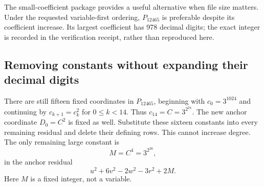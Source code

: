 The small-coefficient package provides a useful alternative when file
size matters. Under the requested variable-first ordering,
$P_{12465}$ is preferable despite its coefficient increase. Its largest
coefficient has 978 decimal digits; the exact integer is recorded in the
verification receipt, rather than reproduced here.

\subsection{Removing constants without expanding their decimal digits}

There are still fifteen fixed coordinates in $P_{12465}$, beginning
with $c_0=3^{1024}$ and continuing by $c_{k+1}=c_k^2$ for
$0\leq k<14$. Thus $c_{14}=C=3^{2^{24}}$. The new anchor coordinate
$D_0=C^2$ is fixed as well. Substitute these sixteen constants into
every remaining residual and delete their defining rows. This cannot
increase degree. The only remaining large constant is
\[
 M=C^4=3^{2^{26}},
\]
in the anchor residual
\[
 u^2+6v^2-2w^2-3r^2+2M.
\]
Here $M$ is a fixed integer, not a variable.

